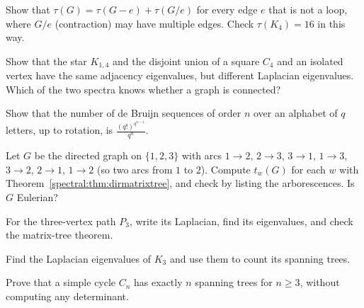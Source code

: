 \begin{exercise}[$\star$]\label{spectral:ex:delcontrees}
Show that $\tau(G)=\tau(G-e)+\tau(G/e)$ for every edge $e$ that is not a loop, where $G/e$ (contraction) may have multiple edges. Check $\tau(K_4)=16$ in this way.
\end{exercise}

\begin{exercise}[$\star$]\label{spectral:ex:cospectral}
Show that the star $K_{1,4}$ and the disjoint union of a square $C_4$ and an isolated vertex have the same adjacency eigenvalues, but different Laplacian eigenvalues. Which of the two
spectra knows whether a graph is connected?
\end{exercise}

\begin{exercise}[$\star\star$]\label{spectral:ex:debruijnq}
Show that the number of de Bruijn sequences of order $n$ over an alphabet of $q$ letters, up to rotation, is $\frac{(q!)^{q^{n-1}}}{q^n}$.
\end{exercise}

\begin{exercise}[$\star$]\label{spectral:ex:arborescences}
Let $G$ be the directed graph on $\{1,2,3\}$ with arcs $1\to2$, $2\to3$, $3\to1$, $1\to3$, $3\to2$, $2\to1$, $1\to2$ (so two arcs from $1$ to $2$). Compute $t_w(G)$ for each $w$ with
Theorem~\ref{spectral:thm:dirmatrixtree}, and check by listing the arborescences. Is $G$ Eulerian?
\end{exercise}







\begin{exercise}[$\star$]\label{spectral:ex:v12pathlap}
For the three-vertex path $P_3$, write its Laplacian, find its eigenvalues, and check the matrix-tree theorem.
\end{exercise}

\begin{exercise}[$\star$]\label{spectral:ex:v12trianglecount}
Find the Laplacian eigenvalues of $K_3$ and use them to count its spanning trees.
\end{exercise}

\begin{exercise}[$\star\star$]\label{spectral:ex:v12cyclecount}
Prove that a simple cycle $C_n$ has exactly $n$ spanning trees for $n\ge3$, without computing any determinant.
\end{exercise}

